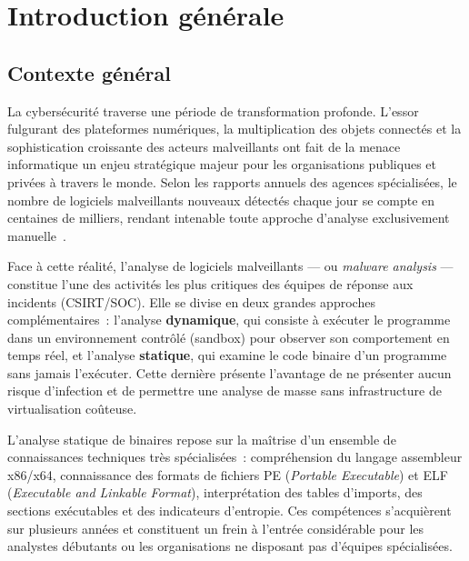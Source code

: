 
\chapter*{Introduction générale}

\section*{Contexte général}

La cybersécurité traverse une période de transformation profonde. L'essor fulgurant des plateformes numériques, la multiplication des objets connectés et la sophistication croissante des acteurs malveillants ont fait de la menace informatique un enjeu stratégique majeur pour les organisations publiques et privées à travers le monde. Selon les rapports annuels des agences spécialisées, le nombre de logiciels malveillants nouveaux détectés chaque jour se compte en centaines de milliers, rendant intenable toute approche d'analyse exclusivement manuelle~\cite{avtest2024}.

Face à cette réalité, l'analyse de logiciels malveillants --- ou \textit{malware analysis} --- constitue l'une des activités les plus critiques des équipes de réponse aux incidents (CSIRT/SOC). Elle se divise en deux grandes approches complémentaires~: l'analyse \textbf{dynamique}, qui consiste à exécuter le programme dans un environnement contrôlé (sandbox) pour observer son comportement en temps réel, et l'analyse \textbf{statique}, qui examine le code binaire d'un programme sans jamais l'exécuter. Cette dernière présente l'avantage de ne présenter aucun risque d'infection et de permettre une analyse de masse sans infrastructure de virtualisation coûteuse.

L'analyse statique de binaires repose sur la maîtrise d'un ensemble de connaissances techniques très spécialisées~: compréhension du langage assembleur x86/x64, connaissance des formats de fichiers PE (\textit{Portable Executable}) et ELF (\textit{Executable and Linkable Format}), interprétation des tables d'imports, des sections exécutables et des indicateurs d'entropie. Ces compétences s'acquièrent sur plusieurs années et constituent un frein à l'entrée considérable pour les analystes débutants ou les organisations ne disposant pas d'équipes spécialisées.

